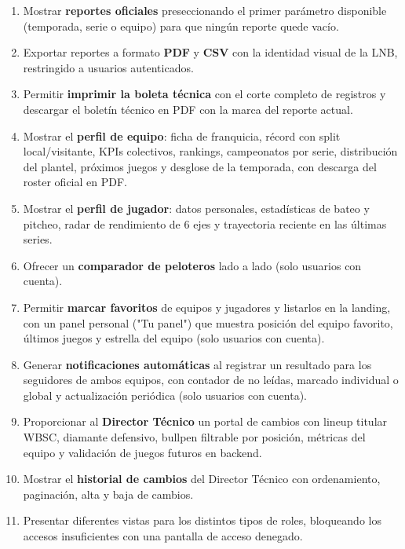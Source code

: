 \documentclass{report}
\begin{document}
\begin{enumerate}
                filtros por texto, número o fecha.
                \item Mostrar \textbf{reportes oficiales} preseccionando el primer parámetro disponible
                (temporada, serie o equipo) para que ningún reporte quede vacío.
                \item Exportar reportes a formato \textbf{PDF} y \textbf{CSV} con la identidad visual de la
                LNB, restringido a usuarios autenticados.
                \item Permitir \textbf{imprimir la boleta técnica} con el corte completo de registros y
                descargar el boletín técnico en PDF con la marca del reporte actual.
                \item Mostrar el \textbf{perfil de equipo}: ficha de franquicia, récord con split
                local/visitante, KPIs colectivos, rankings, campeonatos por serie, distribución del plantel,
                próximos juegos y desglose de la temporada, con descarga del roster oficial en PDF.
                \item Mostrar el \textbf{perfil de jugador}: datos personales, estadísticas de bateo y
                pitcheo, radar de rendimiento de 6 ejes y trayectoria reciente en las últimas series.
                \item Ofrecer un \textbf{comparador de peloteros} lado a lado (solo usuarios con cuenta).
                \item Permitir \textbf{marcar favoritos} de equipos y jugadores y listarlos en la landing,
                con un panel personal ("Tu panel") que muestra posición del equipo favorito, últimos juegos
                y estrella del equipo (solo usuarios con cuenta).
                \item Generar \textbf{notificaciones automáticas} al registrar un resultado para los
                seguidores de ambos equipos, con contador de no leídas, marcado individual o global y
                actualización periódica (solo usuarios con cuenta).
                \item Proporcionar al \textbf{Director Técnico} un portal de cambios con lineup titular
                WBSC, diamante defensivo, bullpen filtrable por posición, métricas del equipo y validación
                de juegos futuros en backend.
                \item Mostrar el \textbf{historial de cambios} del Director Técnico con ordenamiento,
                paginación, alta y baja de cambios.
                \item Presentar diferentes vistas para los distintos tipos de roles, bloqueando los accesos
                insuficientes con una pantalla de acceso denegado.
            \end{enumerate}
\end{document}
